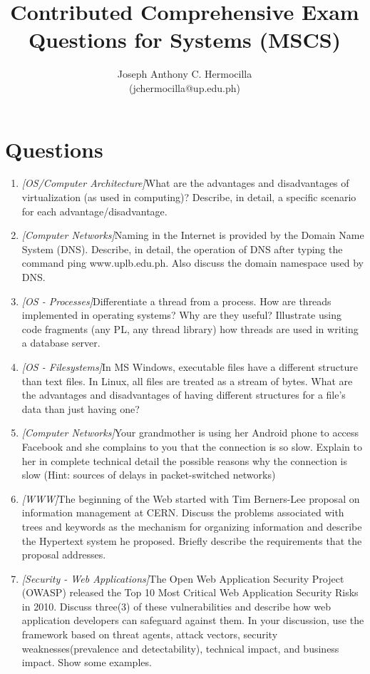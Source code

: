 \documentclass{article}
\title{Contributed Comprehensive Exam Questions for Systems (MSCS)}
\author{Joseph Anthony C. Hermocilla \\ (jchermocilla@up.edu.ph)}
\begin{document}
	\maketitle

	\section*{Questions}
	\begin{enumerate}
  	\item {\textit{[OS/Computer Architecture]}What are the advantages and disadvantages of virtualization (as used in computing)? Describe, in detail, a specific scenario for each advantage/disadvantage.}

	\item{\textit{[Computer Networks]}Naming in the Internet is provided by the Domain Name System (DNS). Describe, in detail, the operation of DNS after typing the command ping www.uplb.edu.ph. Also discuss the domain namespace used by DNS.}
  	
  	\item {\textit{[OS - Processes]}Differentiate a thread from a process. How are threads implemented in operating systems? Why are they useful? Illustrate using code fragments (any PL, any thread library) how threads are used in writing a database server.}
  	
  	\item {\textit{[OS - Filesystems]}In MS Windows, executable files have a different structure than text files. In Linux, all files are treated as a stream of bytes. What are the advantages and disadvantages of having different structures for a file's data than just having one?}
  	
  	\item{\textit{[Computer Networks]}Your grandmother is using her Android phone to access Facebook and she complains to you that the connection is so slow. Explain to her in complete technical detail the possible reasons why the connection is slow (Hint: sources of delays in packet-switched networks)}
  	
  	\item{\textit{[WWW]}The beginning of the Web started with Tim Berners-Lee proposal on information management at CERN. Discuss the problems associated with trees and keywords as the mechanism for organizing information and describe the Hypertext system he proposed. Briefly describe the requirements that the proposal addresses.}
  	
	\item {\textit{[Security - Web Applications]}The Open Web Application Security Project (OWASP)  released the Top 10 Most Critical Web Application Security Risks in 2010. Discuss three(3) of these vulnerabilities and describe how web application developers can safeguard against them. In your discussion, use the framework based on threat agents,  attack vectors, security weaknesses(prevalence and detectability), technical impact, and business impact. Show some examples.} 	
  	

\end{enumerate}
\end{document}
